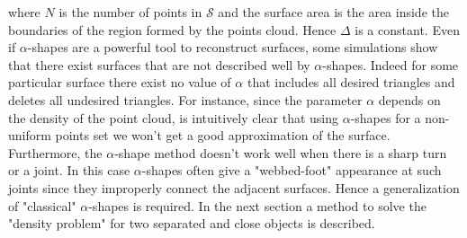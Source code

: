 where $ N $ is the number of points in $\mathcal{S}$ and the surface area is the area inside the boundaries of the region formed by the points cloud. Hence $\Delta$ is a constant.
\indent Even if $\alpha$-shapes are a powerful tool to reconstruct surfaces, some simulations show that there exist surfaces that are not described well by $ \alpha $-shapes. Indeed for some particular surface there exist no value of $\alpha$ that includes all desired triangles and deletes all undesired triangles. For instance, since the parameter $\alpha$ depends on the density of the point cloud, is intuitively clear that using $\alpha$-shapes for a non-uniform points set we won't get a good approximation of the surface. Furthermore, the $\alpha$-shape method doesn't work well when there is a sharp turn or a joint. In this case $\alpha$-shapes often give a "webbed-foot" appearance at such joints since they improperly connect the adjacent surfaces. Hence a generalization of "classical" $\alpha$-shapes is required. In the next section a method to solve the "density problem" for two separated and close objects is described.
